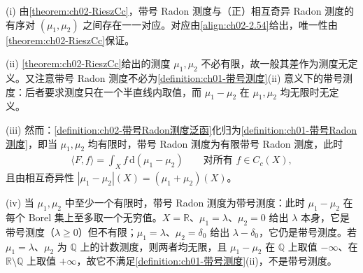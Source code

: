 \documentclass[../../main.tex]{subfiles}%
\begin{document}
\begin{remark}\label{remark:ch02-带号Radon注}
\label{remark:ch02-带号约化}
\label{remark:ch02-RN注}
(i) 由\cref{theorem:ch02-RieszCc}，带号 Radon 测度与（正）相互奇异 Radon 测度的有序对 $(\mu_1,\mu_2)$ 之间存在一一对应。对应由\eqref{align:ch02-2.54}给出，唯一性由\cref{theorem:ch02-RieszCc}保证。

(ii) \cref{theorem:ch02-RieszCc}给出的测度 $\mu_1,\mu_2$ 不必有限，故一般其差作为测度无定义。又注意带号 Radon 测度不必为\cref{definition:ch01-带号测度}(ii) 意义下的带号测度：后者要求测度只在一个半直线内取值，而 $\mu_1-\mu_2$ 在 $\mu_1,\mu_2$ 均无限时无定义。

(iii) 然而：\cref{definition:ch02-带号Radon测度泛函}化归为\cref{definition:ch01-带号Radon测度}，即当 $\mu_1,\mu_2$ 均有限时，带号 Radon 测度为有限带号 Radon 测度，此时
\begin{align*}
\langle F,f\rangle=\int_Xf\,\mathrm{d}(\mu_1-\mu_2)\qquad\text{对所有 }f\in C_c(X),
\end{align*}
且由相互奇异性 $|\mu_1-\mu_2|(X)=(\mu_1+\mu_2)(X)$。

(iv) 当 $\mu_1,\mu_2$ 中至少一个有限时，带号 Radon 测度为带号测度：此时 $\mu_1-\mu_2$ 在每个 Borel 集上至多取一个无穷值。$X=\mathbb R$、$\mu_1=\lambda$、$\mu_2=0$ 给出 $\lambda$ 本身，它是带号测度（$\lambda\geqslant0$）但不有限；$\mu_1=\lambda$、$\mu_2=\delta_0$ 给出 $\lambda-\delta_0$，它仍是带号测度。若 $\mu_1=\lambda$、$\mu_2$ 为 $\mathbb Q$ 上的计数测度，则两者均无限，且 $\mu_1-\mu_2$ 在 $\mathbb Q$ 上取值 $-\infty$、在 $\mathbb R\setminus\mathbb Q$ 上取值 $+\infty$，故它不满足\cref{definition:ch01-带号测度}(ii)，不是带号测度。
\end{remark}
\end{document}
